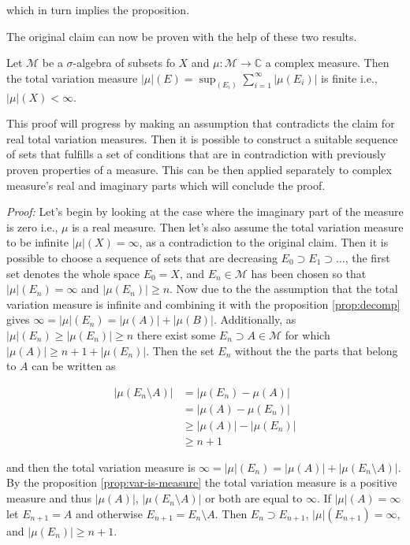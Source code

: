\documentclass[12pt]{artikel1}
\begin{document}
\noindent which in turn implies the proposition. 

\rightline{$\blacksquare$}

The original claim can now be proven with the help of these two results.

\begin{proposition}[label=prop:finiteness]
    Let $\mathcal{M}$ be a $\sigma$-algebra of subsets fo $X$ and $\mu:\mathcal{M}\rightarrow\mathbb{C}$ a complex measure. Then the total variation measure $|\mu|(E)=\sup_{(E_i)}\sum_{i=1}^\infty |\mu(E_i)|$ is finite i.e., $|\mu|(X)<\infty$.
\end{proposition}

This proof will progress by making an assumption that contradicts the claim for real total variation measures. Then it is possible to construct a suitable sequence of sets that fulfills a set of conditions that are in contradiction with previously proven properties of a measure. This can be then applied separately to complex measure's real and imaginary parts which will conclude the proof.

\textit{Proof:} Let's begin by looking at the case where the imaginary part of the measure is zero i.e., $\mu$ is a real measure. Then let's also assume the total variation measure to be infinite $|\mu|(X)=\infty$, as a contradiction to the original claim. Then it is possible to choose a sequence of sets that are decreasing $E_0\supset E_1\supset\ldots$, the first set denotes the whole space $E_0=X$, and $E_n\in\mathcal{M}$ has been chosen so that $|\mu|(E_n)=\infty$ and $|\mu(E_n)|\geq n$. Now due to the the assumption that the total variation measure is infinite and combining it with the proposition \ref{prop:decomp} gives $\infty=|\mu|(E_n)=|\mu(A)|+|\mu(B)|$. Additionally, as $|\mu|(E_n)\geq|\mu(E_n)|\geq n$ there exist some $E_n\supset A\in\mathcal{M}$ for which $|\mu(A)|\geq n+1+|\mu(E_n)|$. Then the set $E_n$ without the the parts that belong to $A$ can be written as

\begin{align*}
    |\mu(E_n\setminus A)|&=|\mu(E_n)-\mu(A)| \\
    &=|\mu(A)-\mu(E_n)| \\
    &\geq|\mu(A)|-|\mu(E_n)| \\
    &\geq n+1
\end{align*}

\noindent and then the total variation measure is $\infty=|\mu|(E_n)=|\mu(A)|+|\mu(E_n\setminus A)|$. By the proposition \ref{prop:var-is-measure} the total variation measure is a positive measure and thus $|\mu(A)|$, $|\mu(E_n\setminus A)|$ or both are equal to $\infty$. If $|\mu|(A)=\infty$ let $E_{n+1}=A$ and otherwise $E_{n+1}=E_n\setminus A$. Then $E_n\supset E_{n+1}$, 
$|\mu|(E_{n+1})=\infty$, and $|\mu(E_n)|\geq n+1$.
\end{document}
